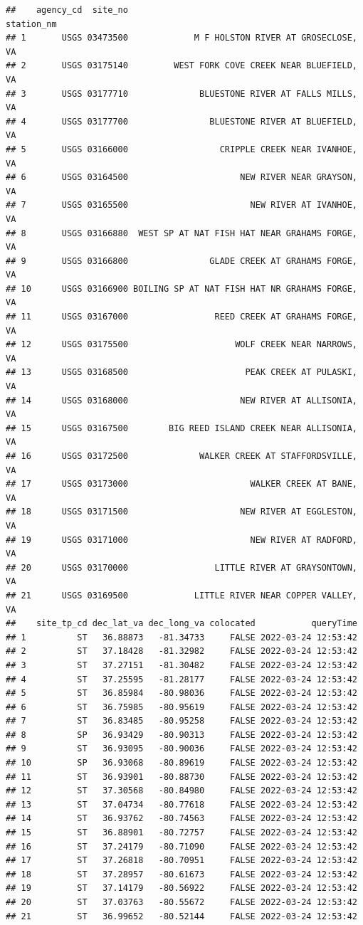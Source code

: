 \documentclass[
]{book}
\begin{document}
\begin{verbatim}
##    agency_cd  site_no                                      station_nm
## 1       USGS 03473500             M F HOLSTON RIVER AT GROSECLOSE, VA
## 2       USGS 03175140         WEST FORK COVE CREEK NEAR BLUEFIELD, VA
## 3       USGS 03177710              BLUESTONE RIVER AT FALLS MILLS, VA
## 4       USGS 03177700                BLUESTONE RIVER AT BLUEFIELD, VA
## 5       USGS 03166000                  CRIPPLE CREEK NEAR IVANHOE, VA
## 6       USGS 03164500                      NEW RIVER NEAR GRAYSON, VA
## 7       USGS 03165500                        NEW RIVER AT IVANHOE, VA
## 8       USGS 03166880  WEST SP AT NAT FISH HAT NEAR GRAHAMS FORGE, VA
## 9       USGS 03166800                GLADE CREEK AT GRAHAMS FORGE, VA
## 10      USGS 03166900 BOILING SP AT NAT FISH HAT NR GRAHAMS FORGE, VA
## 11      USGS 03167000                 REED CREEK AT GRAHAMS FORGE, VA
## 12      USGS 03175500                     WOLF CREEK NEAR NARROWS, VA
## 13      USGS 03168500                       PEAK CREEK AT PULASKI, VA
## 14      USGS 03168000                      NEW RIVER AT ALLISONIA, VA
## 15      USGS 03167500        BIG REED ISLAND CREEK NEAR ALLISONIA, VA
## 16      USGS 03172500              WALKER CREEK AT STAFFORDSVILLE, VA
## 17      USGS 03173000                        WALKER CREEK AT BANE, VA
## 18      USGS 03171500                      NEW RIVER AT EGGLESTON, VA
## 19      USGS 03171000                        NEW RIVER AT RADFORD, VA
## 20      USGS 03170000                 LITTLE RIVER AT GRAYSONTOWN, VA
## 21      USGS 03169500             LITTLE RIVER NEAR COPPER VALLEY, VA
##    site_tp_cd dec_lat_va dec_long_va colocated           queryTime
## 1          ST   36.88873   -81.34733     FALSE 2022-03-24 12:53:42
## 2          ST   37.18428   -81.32982     FALSE 2022-03-24 12:53:42
## 3          ST   37.27151   -81.30482     FALSE 2022-03-24 12:53:42
## 4          ST   37.25595   -81.28177     FALSE 2022-03-24 12:53:42
## 5          ST   36.85984   -80.98036     FALSE 2022-03-24 12:53:42
## 6          ST   36.75985   -80.95619     FALSE 2022-03-24 12:53:42
## 7          ST   36.83485   -80.95258     FALSE 2022-03-24 12:53:42
## 8          SP   36.93429   -80.90313     FALSE 2022-03-24 12:53:42
## 9          ST   36.93095   -80.90036     FALSE 2022-03-24 12:53:42
## 10         SP   36.93068   -80.89619     FALSE 2022-03-24 12:53:42
## 11         ST   36.93901   -80.88730     FALSE 2022-03-24 12:53:42
## 12         ST   37.30568   -80.84980     FALSE 2022-03-24 12:53:42
## 13         ST   37.04734   -80.77618     FALSE 2022-03-24 12:53:42
## 14         ST   36.93762   -80.74563     FALSE 2022-03-24 12:53:42
## 15         ST   36.88901   -80.72757     FALSE 2022-03-24 12:53:42
## 16         ST   37.24179   -80.71090     FALSE 2022-03-24 12:53:42
## 17         ST   37.26818   -80.70951     FALSE 2022-03-24 12:53:42
## 18         ST   37.28957   -80.61673     FALSE 2022-03-24 12:53:42
## 19         ST   37.14179   -80.56922     FALSE 2022-03-24 12:53:42
## 20         ST   37.03763   -80.55672     FALSE 2022-03-24 12:53:42
## 21         ST   36.99652   -80.52144     FALSE 2022-03-24 12:53:42
\end{verbatim}
\end{document}
